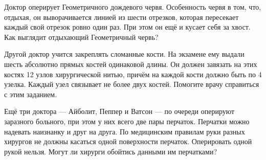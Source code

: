 ﻿
\begin{itemize}

\itA Доктор оперирует Геометричного дождевого червя. Особенность червя в том, что, отдыхая, он выворачивается линией из шести отрезков, которая пересекает каждый свой отрезок ровно один раз. При этом он ещё и кусает себя за хвост. Как выглядит отдыхающий Геометричный червь?

\itB Другой доктор учится закреплять сломанные кости. На экзамене ему выдали шесть абсолютно прямых костей одинаковой длины. Он должен завязать на этих костях 12 узлов хирургической нитью, причём на каждой кости должно быть по 4 узелка. Каждый узел связывает не более двух костей. Помогите врачу справиться с этим заданием.

\itC Ещё три доктора — Айболит, Пеппер и Ватсон — по очереди оперируют заразного больного, при этом у них всего две пары перчаток. Перчатки можно надевать наизнанку и друг на друга. По медицинским правилам руки разных хирургов не должны касаться одной поверхности перчаток. Оперировать одной рукой нельзя. Могут ли хирурги обойтись данными им перчатками?
\end{itemize}